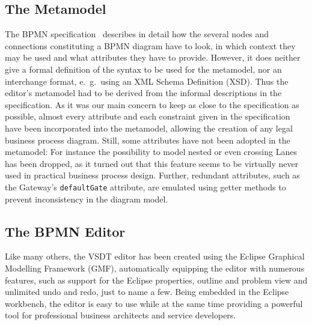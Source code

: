 \subsection{The Metamodel}
\label{sec:intro_vsdt_meta}

The BPMN specification~\cite{omg2009bpmn} describes in detail how the several
nodes and connections constituting a BPMN diagram have to look, in which context
they may be used and what attributes they have to provide.  However, it does
neither give a formal definition of the syntax to be used for the metamodel, nor
an interchange format, e.~g.\ using an XML Schema Definition (XSD).  Thus the
editor's metamodel had to be derived from the informal descriptions in the
specification.  As it was our main concern to keep as close to the specification
as possible, almost every attribute and each constraint given in the specification
have been incorporated into the metamodel, allowing the creation of any legal
business process diagram.  Still, some attributes have not been adopted in the
metamodel: For instance the possibility to model nested or even crossing Lanes
has been dropped, as it turned out that this feature seems to be virtually never
used in practical business process design.  Further, redundant attributes, such
as the Gateway's \texttt{defaultGate} attribute, are emulated using getter methods
to prevent inconsistency in the diagram model.



\subsection{The BPMN Editor}
\label{sec:intro_vsdt_editor}

Like many others, the VSDT editor has been created using the Eclipse Graphical
Modelling Framework (GMF), automatically equipping the editor with numerous
features, such as support for the Eclipse properties, outline and problem view
and unlimited undo and redo, just to name a few.  Being embedded in the Eclipse
workbench, the editor is easy to use while at the same time providing a powerful
tool for professional business architects and service developers.

